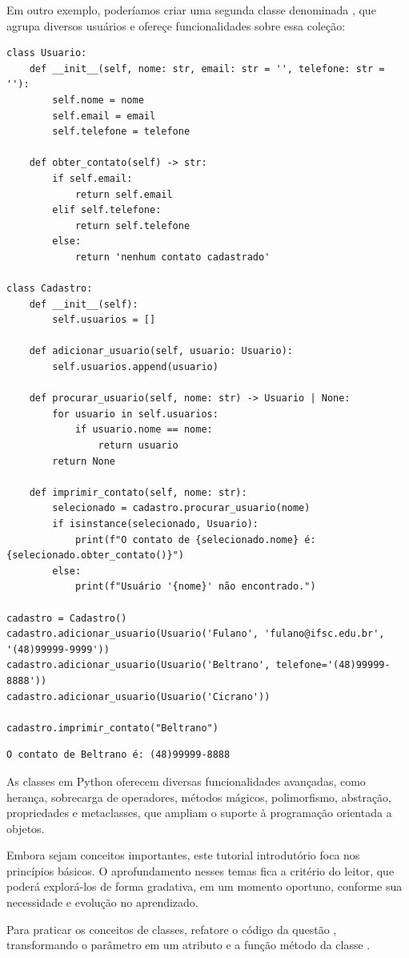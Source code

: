 \pagebreak
Em outro exemplo, poderíamos criar uma segunda classe denominada , que agrupa diversos
usuários e ofereçe funcionalidades sobre essa coleção:
\begin{verbatim}
class Usuario:
    def __init__(self, nome: str, email: str = '', telefone: str = ''):
        self.nome = nome
        self.email = email
        self.telefone = telefone

    def obter_contato(self) -> str:
        if self.email:
            return self.email
        elif self.telefone:
            return self.telefone
        else:
            return 'nenhum contato cadastrado'

class Cadastro:
    def __init__(self):
        self.usuarios = []

    def adicionar_usuario(self, usuario: Usuario):
        self.usuarios.append(usuario)

    def procurar_usuario(self, nome: str) -> Usuario | None:
        for usuario in self.usuarios:
            if usuario.nome == nome:
                return usuario
        return None

    def imprimir_contato(self, nome: str):
        selecionado = cadastro.procurar_usuario(nome)
        if isinstance(selecionado, Usuario):
            print(f"O contato de {selecionado.nome} é: {selecionado.obter_contato()}")
        else:
            print(f"Usuário '{nome}' não encontrado.")

cadastro = Cadastro()
cadastro.adicionar_usuario(Usuario('Fulano', 'fulano@ifsc.edu.br', '(48)99999-9999'))
cadastro.adicionar_usuario(Usuario('Beltrano', telefone='(48)99999-8888'))
cadastro.adicionar_usuario(Usuario('Cicrano'))

cadastro.imprimir_contato("Beltrano")
\end{verbatim}
\begin{verbatim}
O contato de Beltrano é: (48)99999-8888
\end{verbatim}

As classes em Python oferecem diversas funcionalidades avançadas, como herança, sobrecarga de operadores, métodos
mágicos, polimorfismo, abstração, propriedades e metaclasses, que ampliam o suporte à programação orientada a objetos.

Embora sejam conceitos importantes, este tutorial introdutório foca nos princípios básicos.
O aprofundamento nesses temas fica a critério do leitor, que poderá explorá-los de forma gradativa, em um momento
oportuno, conforme sua necessidade e evolução no aprendizado.

Para praticar os conceitos de classes, refatore o código da questão , transformando o parâmetro
 em um atributo e a função  método
da classe .



